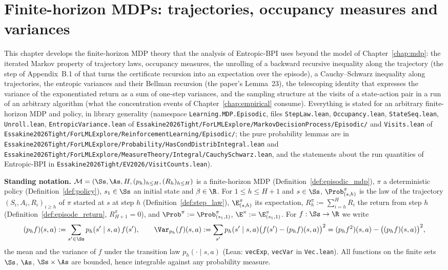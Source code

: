 \chapter{Finite-horizon MDPs: trajectories, occupancy measures and variances}
\label{chap:pre_mdp}

This chapter develops the finite-horizon MDP theory that the analysis of Entropic-BPI uses
beyond the model of Chapter~\ref{chap:mdp}: the iterated Markov property of trajectory laws,
occupancy measures, the unrolling of a backward recursive inequality along the trajectory
(the step of Appendix~B.1 of \cite{essakine2026tight} that turns the certificate recursion
into an expectation over the episode), a Cauchy--Schwarz inequality along trajectories, the
entropic variances and their Bellman recursion (the paper's Lemma~23), the telescoping
identity that expresses the variance of the exponentiated return as a sum of one-step
variances, and the sampling structure at the visits of a state-action pair in a run of an
arbitrary algorithm (what the concentration events of Chapter~\ref{chap:empirical} consume).
Everything is stated for an arbitrary finite-horizon MDP and policy, in library generality
(namespace \texttt{Learning.MDP.Episodic}, files \texttt{StepLaw.lean}, \texttt{Occupancy.lean},
\texttt{StateSeq.lean}, \texttt{Unroll.lean}, \texttt{EntropicVariance.lean} of
\texttt{Essakine2026Tight/ForLMLExplore/MarkovDecisionProcess/Episodic/} and \texttt{Visits.lean} of
\texttt{Essakine2026Tight/ForLMLExplore/ReinforcementLearning/Episodic/}; the pure probability
lemmas are in \texttt{Essakine2026Tight/ForLMLExplore/Probability/HasCondDistribIntegral.lean} and
\texttt{Essakine2026Tight/ForLMLExplore/MeasureTheory/Integral/CauchySchwarz.lean}, and the statements
about the run quantities of Entropic-BPI in \texttt{Essakine2026Tight/EV2026/VisitCounts.lean}).

\textbf{Standing notation.} $\mathcal M = (\Ss, \As, H, (p_h)_{h \le H}, (R_h)_{h \le H})$ is
a finite-horizon MDP (Definition~\ref{def:episodic_mdp}), $\pi$ a deterministic policy
(Definition~\ref{def:policy}), $s_1 \in \Ss$ an initial state and $\beta \in \R$. For
$1 \le h \le H + 1$ and $s \in \Ss$, $\Prob^\pi_{(s,h)}$ is the law of the trajectory
$(S_i, A_i, R_i)_{i \ge h}$ of $\pi$ started at $s$ at step $h$ (Definition~\ref{def:step_law}),
$\E^\pi_{(s,h)}$ its expectation, $R^\pi_h := \sum_{i = h}^H R_i$ the return from step $h$
(Definition~\ref{def:episode_return}, $R^\pi_{H+1} = 0$), and $\Prob^\pi := \Prob^\pi_{(s_1, 1)}$,
$\E^\pi := \E^\pi_{(s_1,1)}$. For $f : \Ss \to \R$ we write
\[
  (p_h f)(s, a) := \sum_{s' \in \Ss} p_h(s' \mid s, a)\, f(s'), \qquad
  \Var_{p_h}(f)(s, a) := \sum_{s'} p_h(s' \mid s, a)\big(f(s') - (p_h f)(s,a)\big)^2
  = (p_h f^2)(s,a) - \big((p_h f)(s,a)\big)^2 ,
\]
the mean and the variance of $f$ under the transition law $p_h(\cdot \mid s, a)$ (Lean:
\texttt{vecExp}, \texttt{vecVar} in \texttt{Vec.lean}). All functions on the finite sets
$\Ss$, $\As$, $\Ss \times \As$ are bounded, hence integrable against any probability measure.

